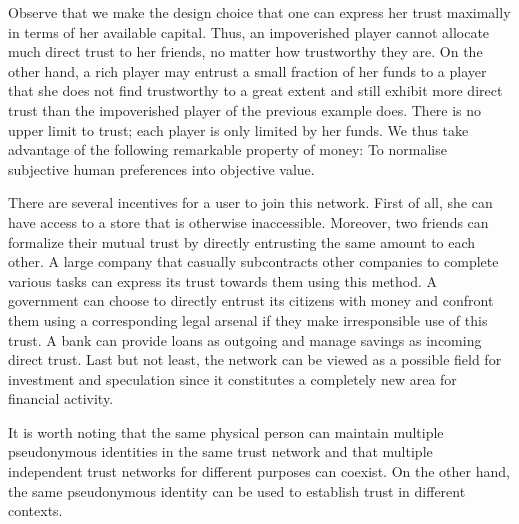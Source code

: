   Observe that we make the design choice that one can express her trust maximally in terms of her available capital. Thus,
  an impoverished player cannot allocate much direct trust to her friends, no matter how trustworthy they are. On the other
  hand, a rich player may entrust a small fraction of her funds to a player that she does not find trustworthy to a great
  extent and still exhibit more direct trust than the impoverished player of the previous example does. There is no upper
  limit to trust; each player is only limited by her funds. We thus take advantage of the following remarkable property of
  money: To normalise subjective human preferences into objective value.

  There are several incentives for a user to join this network. First of all, she can have access to a store that is
  otherwise inaccessible. Moreover, two friends can formalize their mutual trust by directly entrusting the same amount to
  each other. A large company that casually subcontracts other companies to complete various tasks can express its trust
  towards them using this method. A government can choose to directly entrust its citizens with money and confront them using
  a corresponding legal arsenal if they make irresponsible use of this trust. A bank can provide loans as outgoing and
  manage savings as incoming direct trust. Last but not least, the network can be viewed as a possible field for investment
  and speculation since it constitutes a completely new area for financial activity.

  It is worth noting that the same physical person can maintain multiple pseudonymous identities in the same trust network
  and that multiple independent trust networks for different purposes can coexist. On the other hand, the same pseudonymous
  identity can be used to establish trust in different contexts.
